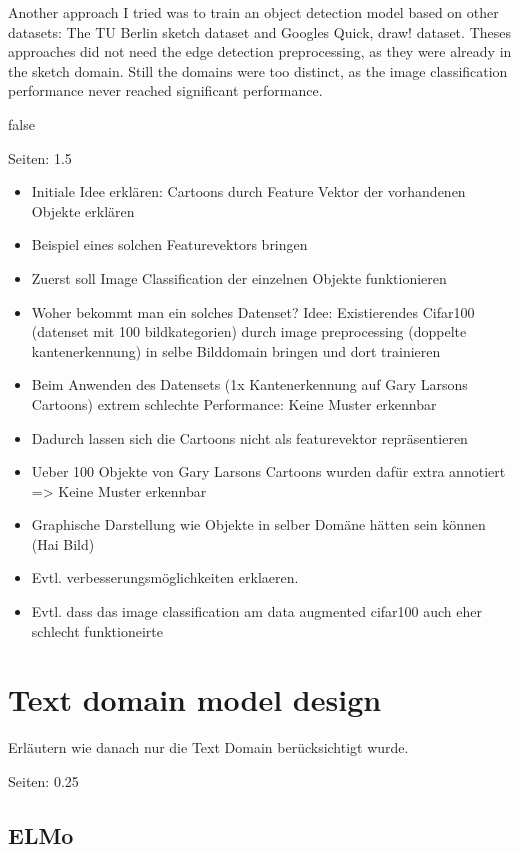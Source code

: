 \documentclass[draft,final,oneside]{vutinfth} %
\begin{document}
Another approach I tried was to train an object detection model based on other datasets: The TU Berlin sketch dataset and Googles Quick, draw! dataset.\cite{tuberlin}\cite{quickdraw} Theses approaches did not need the edge detection preprocessing, as they were already in the sketch domain. Still the domains were too distinct, as the image classification performance never reached significant performance.

\if false

Seiten: 1.5

\begin{itemize}
\item Initiale Idee erklären: Cartoons durch Feature Vektor der vorhandenen Objekte erklären
\item Beispiel eines solchen Featurevektors bringen
\item Zuerst soll Image Classification der einzelnen Objekte funktionieren
\item Woher bekommt man ein solches Datenset? Idee: Existierendes Cifar100 (datenset mit 100 bildkategorien) durch image preprocessing (doppelte kantenerkennung) in selbe Bilddomain bringen und dort trainieren
\item Beim Anwenden des Datensets (1x Kantenerkennung auf Gary Larsons Cartoons) extrem schlechte Performance: Keine Muster erkennbar
\item Dadurch lassen sich die Cartoons nicht als featurevektor repräsentieren
\item Ueber 100 Objekte von Gary Larsons Cartoons wurden dafür extra annotiert => Keine Muster erkennbar
\item Graphische Darstellung wie Objekte in selber Domäne hätten sein können (Hai Bild)
\item Evtl. verbesserungsmöglichkeiten erklaeren.
\item Evtl. dass das image classification am data augmented cifar100 auch eher schlecht funktioneirte
\end{itemize}

\fi

\section{Text domain model design}

Erläutern wie danach nur die Text Domain berücksichtigt wurde.

Seiten: 0.25

\subsection{ELMo}
\end{document}
